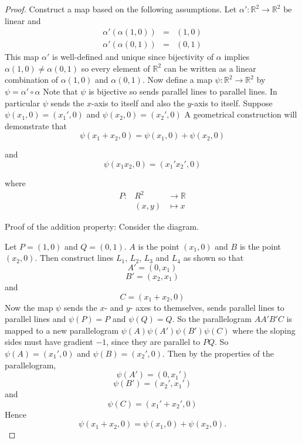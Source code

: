 \documentclass[honours]{UNSWthesis}
\newcommand{\R}{\mathbb{R}}
\newcommand{\1}{\mathbf{e}_{1}}
\newcommand{\2}{\mathbf{e}_{3}}
\newcommand{\3}{\mathbf{e}_{3}}
\begin{document}
\begin{proof}
Construct a map based on the following assumptions. Let $\alpha': \R^{2} \longrightarrow \R^{2}$ be linear and
\begin{eqnarray*}
\alpha'(\alpha(1,0))&=& (1,0)\\
\alpha'(\alpha(0,1)) &=& (0,1)
\end{eqnarray*}
This map $\alpha'$ is well-defined and unique since bijectivity of $\alpha$ implies $\alpha(1,0) \neq \alpha(0,1)$ so every element of $\R^{2}$ can be written as a linear combination of $\alpha(1,0)$ and $\alpha(0,1)$. 
Now define a map $\psi: \R^{2} \longrightarrow \R^{2}$ by $\psi= \alpha' \circ \alpha$
Note that $\psi$ is bijective so sends parallel lines to parallel lines. In particular $\psi$ sends the $x$-axis to itself and also the $y$-axis to itself. Suppose $\psi(x_{1},0)=(x_{1}',0)$ and $\psi(x_{2},0)=(x_{2}',0)$
A geometrical construction will demonstrate that
\begin{equation}
\psi(x_{1}+x_{2},0)=\psi(x_{1},0)+\psi(x_{2},0)
\end{equation}

and 
\begin{equation}
\psi(x_{1}x_{2},0)=(x_{1}'x_{2}',0)
\end{equation}


where 
\begin{eqnarray*}
P: &R^{2}& \longrightarrow \R \\
&(x,y)& \longmapsto x
\end{eqnarray*}

Proof of the addition property:
Consider the diagram.


Let $P=(1,0)$ and $Q=(0,1)$. $A$ is the point $(x_{1},0)$ and $B$ is the point $(x_{2},0)$. Then construct lines $L_{1}$, $L_{2}$, $L_{3}$ and $L_{4}$ as shown so that $$A'=(0,x_{1})$$ $$B'=(x_{2}, x_{1})$$ and $$C=(x_{1}+x_{2},0)$$ Now the map $\psi$ sends the $x$- and $y$- axes to themselves, sends parallel lines to parallel lines and $\psi(P)=P$ and $\psi(Q)=Q$. So the parallelogram $AA'B'C$ is mapped to a new parallelogram $\psi(A)\psi(A')\psi(B')\psi(C)$ where the sloping sides must have gradient $-1$, since they are parallel to $PQ$. So $\psi(A)=(x_{1}',0)$ and $\psi(B)=(x_{2}',0)$. Then by the properties of the parallelogram, 
\[
\psi(A')=(0,x_{1}')
\]
\[
\psi(B')=(x_{2}',x_{1}')
\]
and 
\[
\psi(C)=(x_{1}'+x_{2}',0)
\]
Hence 
\begin{equation}\label{axisaddnmap}
\psi(x_{1}+x_{2},0)=\psi(x_{1},0)+\psi(x_{2},0). 
\end{equation}


\end{proof}
\end{document}
